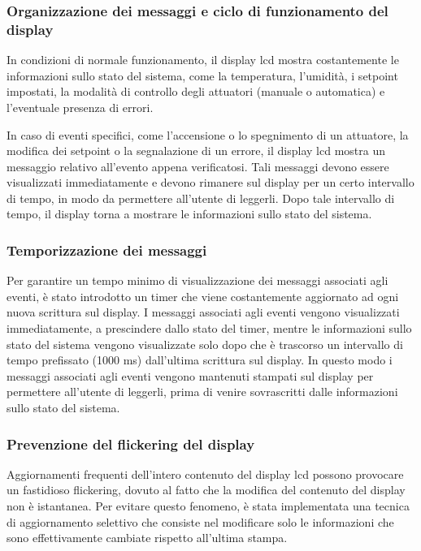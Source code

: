 \subsubsection{Organizzazione dei messaggi e ciclo di funzionamento del display}
In condizioni di normale funzionamento, il display lcd mostra costantemente le informazioni sullo stato del sistema, come
la temperatura, l'umidità, i setpoint impostati, la modalità di controllo degli attuatori (manuale o automatica) e l'eventuale
presenza di errori.

In caso di eventi specifici, come l'accensione o lo spegnimento di un attuatore, la modifica dei setpoint o la segnalazione
di un errore, il display lcd mostra un messaggio relativo all'evento appena verificatosi. Tali messaggi devono essere
visualizzati immediatamente e devono rimanere sul display per un certo intervallo di tempo, in modo da permettere all'utente
di leggerli. Dopo tale intervallo di tempo, il display torna a mostrare le informazioni sullo stato del sistema.

\subsubsection{Temporizzazione dei messaggi}
Per garantire un tempo minimo di visualizzazione dei messaggi associati agli eventi, è stato introdotto un timer che viene
costantemente aggiornato ad ogni nuova scrittura sul display. I messaggi associati agli eventi vengono visualizzati
immediatamente, a prescindere dallo stato del timer, mentre le informazioni sullo stato del sistema vengono visualizzate
solo dopo che è trascorso un intervallo di tempo prefissato (1000 ms) dall'ultima scrittura sul display. In questo modo
i messaggi associati agli eventi vengono mantenuti stampati sul display per permettere all'utente di leggerli, prima di
venire sovrascritti dalle informazioni sullo stato del sistema.

\subsubsection{Prevenzione del flickering del display}
Aggiornamenti frequenti dell'intero contenuto del display lcd possono provocare un fastidioso flickering, dovuto al fatto
che la modifica del contenuto del display non è istantanea. Per evitare questo fenomeno, è stata implementata una tecnica
di aggiornamento selettivo che consiste nel modificare solo le informazioni che sono effettivamente cambiate rispetto
all'ultima stampa.

